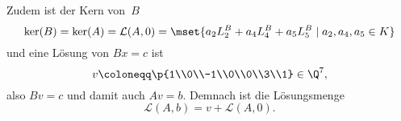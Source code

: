 \documentclass[a4paper]{article}
\begin{document}
\begin{example}
\begin{equation*}
    \end{equation*}
    Zudem ist der Kern von~$B$
    \begin{equation*}
        \ker(B) = \ker(A) = \mathcal{L}(A, 0) = \mset{a_2L_2^B + a_4L_4^B + a_5L_5^B \mid a_2,a_4,a_5 \in K}
    \end{equation*}
    und eine Lösung von $Bx = c$ ist
    \begin{equation*}
        v \coloneqq \p{1\\0\\-1\\0\\0\\3\\1} \in \Q^7,
    \end{equation*}
    also $Bv = c$ und damit auch $Av = b$. Demnach ist die Lösungsmenge
    \begin{equation*}
        \mathcal{L}(A,b) = v + \mathcal{L}(A, 0).
    \end{equation*}
\end{example}
\end{document}
